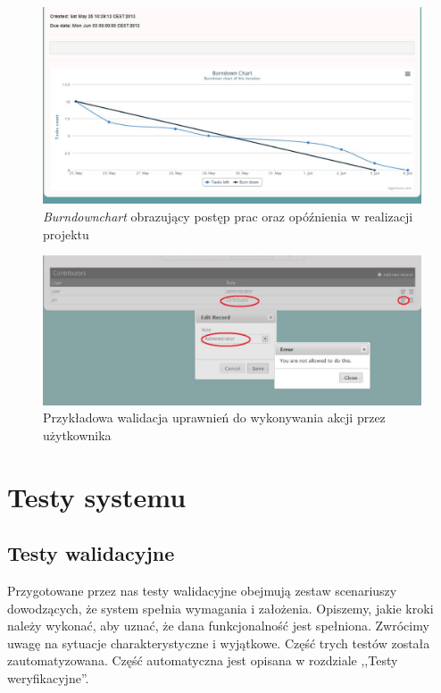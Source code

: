 \documentclass[a4paper,12pt,notitlepage]{mwrep}
\begin{document}
\begin{figure}[H]
\centering
\includegraphics[scale=0.45]{images/app/8.png}
\caption{\textit{Burndownchart} obrazujący postęp prac oraz opóźnienia w realizacji projektu}
\label{fig:app_login}
\end{figure}

\begin{figure}[H]
\centering
\includegraphics[scale=0.45]{images/app/9.png}
\caption{Przykładowa walidacja uprawnień do wykonywania akcji przez użytkownika}
\label{fig:app_RBAC}
\end{figure}


\chapter{Testy systemu}

\section{Testy walidacyjne}
Przygotowane przez nas testy walidacyjne obejmują zestaw scenariuszy dowodzących, że system spełnia wymagania i założenia. 
Opiszemy, jakie kroki należy wykonać, aby uznać, że dana funkcjonalność jest spełniona. Zwrócimy uwagę na sytuacje charakterystyczne i wyjątkowe. 
Część trych testów została zautomatyzowana. Część automatyczna jest opisana w rozdziale ,,Testy weryfikacyjne''.
\end{document}
